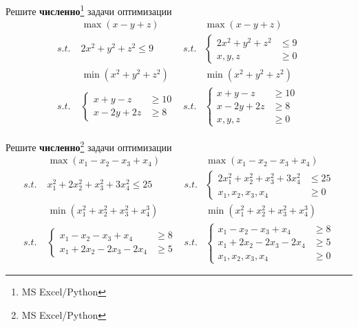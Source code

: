 \begin{exercise}
Решите \textbf{численно}\footnote{MS Excel/Python} задачи оптимизации
\begin{align*}
	&\max (x-y+z) & &\max (x-y+z) \\
	s.t.\;& 2x^2+y^2+z^2\leq 9 &
	s.t.&\left\{\begin{aligned}
		2x^2+y^2+z^2 &\leq 9 \\ x,y,z&\geq 0 
	\end{aligned}\right. \\
	&\min (x^2+y^2+z^2) & &\min(x^2+y^2+z^2) \\
	s.t.&\left\{\begin{aligned}
		x+y-z &\geq 10 \\ x-2y+2z&\geq 8 
	\end{aligned}\right. &
	s.t.&\left\{\begin{aligned}
		x+y-z &\geq 10 \\ x-2y+2z&\geq 8 \\ x,y,z &\geq0 
	\end{aligned}\right.
\end{align*}
\end{exercise}

\begin{exercise}
Решите \textbf{численно}\footnote{MS Excel/Python} задачи оптимизации
\begin{align*}
	&\max (x_1-x_2-x_3+x_4) & &\max (x_1-x_2-x_3+x_4) \\
	s.t.\;& x_1^2+2x_2^2+x_3^2+3x_4^2\leq 25 &
	s.t.&\left\{\begin{aligned}
		2x_1^2+x_2^2+x_3^2+3x_4^2 &\leq 25 \\ x_1,x_2,x_3,x_4&\geq 0 
	\end{aligned}\right. \\
	&\min (x_1^2+x_2^2+x_3^2+x_4^3) & &\min(x_1^2+x_2^2+x_3^2+x_4^3) \\
	s.t.&\left\{\begin{aligned}
		x_1-x_2-x_3+x_4 &\geq 8 \\ x_1+2x_2-2x_3-2x_4&\geq 5 
	\end{aligned}\right. &
	s.t.&\left\{\begin{aligned}
		x_1-x_2-x_3+x_4 &\geq 8 \\ x_1+2x_2-2x_3-2x_4&\geq 5 \\ 
		x_1,x_2,x_3,x_4 &\geq0 
	\end{aligned}\right.
\end{align*}
\end{exercise}

